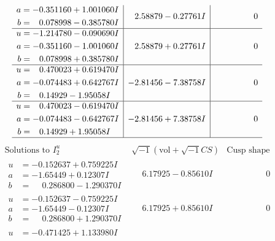 \documentclass[1p]{elsarticle_modified}
\theoremstyle{definition}
\newcommand{\I}{\sqrt{-1}}
\begin{document}
$$\begin{array}{c|c|c}
\begin{aligned}
a &= -0.351160 + 1.001060 I \\
b &= \phantom{-}0.078998 - 0.385780 I\end{aligned}
 & \phantom{-}2.58879 - 0.27761 I & \phantom{-0.000000 } 0 \\ \hline\begin{aligned}
u &= -1.214780 - 0.090690 I \\
a &= -0.351160 - 1.001060 I \\
b &= \phantom{-}0.078998 + 0.385780 I\end{aligned}
 & \phantom{-}2.58879 + 0.27761 I & \phantom{-0.000000 } 0 \\ \hline\begin{aligned}
u &= \phantom{-}0.470023 + 0.619470 I \\
a &= -0.074483 + 0.642767 I \\
b &= \phantom{-}0.14929 - 1.95058 I\end{aligned}
 & -2.81456 - 7.38758 I & \phantom{-0.000000 } 0 \\ \hline\begin{aligned}
u &= \phantom{-}0.470023 - 0.619470 I \\
a &= -0.074483 - 0.642767 I \\
b &= \phantom{-}0.14929 + 1.95058 I\end{aligned}
 & -2.81456 + 7.38758 I & \phantom{-0.000000 } 0\\
 \hline 
 \end{array}$$\newpage$$\begin{array}{c|c|c}  
\text{Solutions to }I^u_{2}& \I (\text{vol} + \sqrt{-1}CS) & \text{Cusp shape}\\
 \hline 
\begin{aligned}
u &= -0.152637 + 0.759225 I \\
a &= -1.65449 + 0.12307 I \\
b &= \phantom{-}0.286800 - 1.290370 I\end{aligned}
 & \phantom{-}6.17925 - 0.85610 I & \phantom{-0.000000 } 0 \\ \hline\begin{aligned}
u &= -0.152637 - 0.759225 I \\
a &= -1.65449 - 0.12307 I \\
b &= \phantom{-}0.286800 + 1.290370 I\end{aligned}
 & \phantom{-}6.17925 + 0.85610 I & \phantom{-0.000000 } 0 \\ \hline\begin{aligned}
u &= -0.471425 + 1.133980 I \\

\end{aligned}
\end{array}$$
\end{document}
